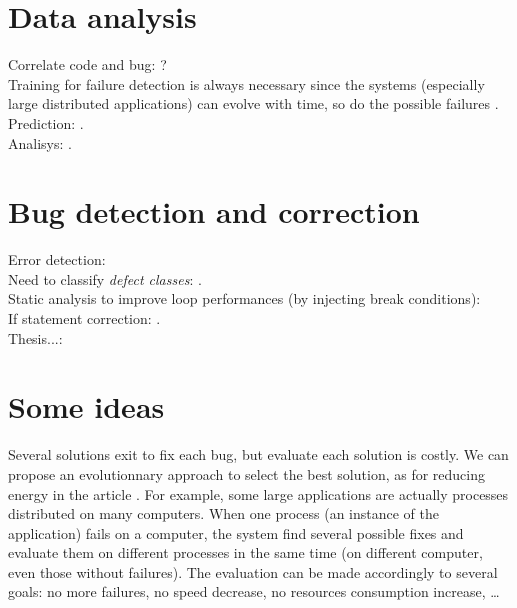 \section{Data analysis}


Correlate code and bug: \cite{Art6} ?\\
Training for failure detection is always necessary since the systems (especially large distributed applications) can evolve with time, so do the possible failures \cite{Art1}.\\
Prediction: \cite{Art11}.\\
Analisys: \cite{Art12, Art14}.

\section{Bug detection and correction}

Error detection: \cite{Art17}\\
Need to classify \emph{defect classes}: \cite{Art8}.\\
Static analysis to improve loop performances (by injecting break conditions): \cite{Art9}\\
If statement correction: \cite{Art13}.\\
Thesis...: \cite{Art18}

\section{Some ideas}

Several solutions exit to fix each bug, but evaluate each solution is costly. We can propose an evolutionnary approach to select the best solution, as for reducing energy in the article \cite{Art19}. For example, some large applications are actually processes distributed on many computers. When one process (an instance of the application) fails on a computer, the system find several possible fixes and evaluate them on different processes in the same time (on different computer, even those without failures). The evaluation can be made accordingly to several goals: no more failures, no speed decrease, no resources consumption increase, \ldots
